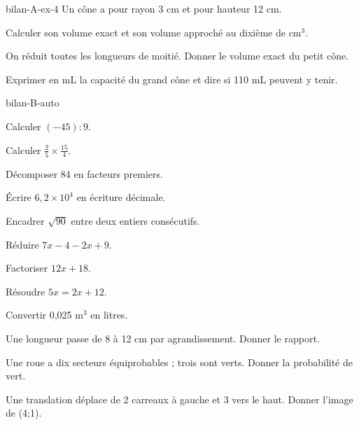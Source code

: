 \begin{blocEdition}{bilan-A-ex-4}
Un cône a pour rayon 3 cm et pour hauteur 12 cm.\begin{questions}
\item Calculer son volume exact et son volume approché au dixième de cm$^3$.
\item On réduit toutes les longueurs de moitié. Donner le volume exact du petit cône.
\item Exprimer en mL la capacité du grand cône et dire si 110 mL peuvent y tenir.
\end{questions}\label{fig-bilan-A-ex-4}
\par{}\par\par{}\par{}\par{}\par{}\par{}\par{}
\end{blocEdition}
\begin{blocEdition}{bilan-B-auto}
\begin{questions}
\item Calculer $(-45):9$.
\item Calculer $\frac25\times\frac{15}{4}$.
\item Décomposer 84 en facteurs premiers.
\item Écrire $6{,}2\times10^4$ en écriture décimale.
\item Encadrer $\sqrt{90}$ entre deux entiers consécutifs.
\item Réduire $7x-4-2x+9$.
\item Factoriser $12x+18$.
\item Résoudre $5x=2x+12$.
\item Convertir 0,025 m$^3$ en litres.
\item Une longueur passe de 8 à 12 cm par agrandissement. Donner le rapport.
\item Une roue a dix secteurs équiprobables ; trois sont verts. Donner la probabilité de vert.
\item Une translation déplace de 2 carreaux à gauche et 3 vers le haut. Donner l’image de (4;1).\end{questions}
\end{blocEdition}
